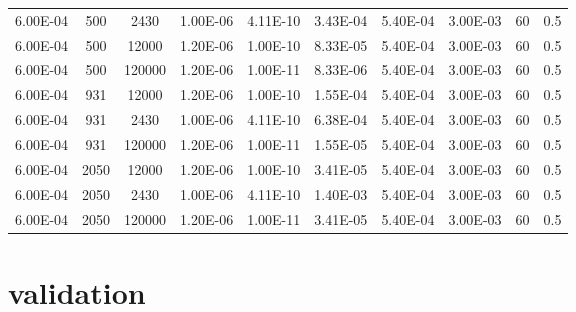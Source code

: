 \documentclass[../thesis.tex]{subfiles}
\begin{document}
\begin{landscape}
\begin{table}[htb]
\begin{tabular}{cccccccccc}
			6.00E-04            & 500         & 2430        & 1.00E-06               & 4.11E-10               & 3.43E-04              & 5.40E-04      & 3.00E-03        & 60                            & 0.5                       \\
			6.00E-04            & 500         & 12000       & 1.20E-06               & 1.00E-10               & 8.33E-05              & 5.40E-04      & 3.00E-03        & 60                            & 0.5                       \\
			6.00E-04            & 500         & 120000      & 1.20E-06               & 1.00E-11               & 8.33E-06              & 5.40E-04      & 3.00E-03        & 60                            & 0.5                       \\
			6.00E-04            & 931         & 12000       & 1.20E-06               & 1.00E-10               & 1.55E-04              & 5.40E-04      & 3.00E-03        & 60                            & 0.5                       \\
			6.00E-04            & 931         & 2430        & 1.00E-06               & 4.11E-10               & 6.38E-04              & 5.40E-04      & 3.00E-03        & 60                            & 0.5                       \\
			6.00E-04            & 931         & 120000      & 1.20E-06               & 1.00E-11               & 1.55E-05              & 5.40E-04      & 3.00E-03        & 60                            & 0.5                       \\
			6.00E-04            & 2050        & 12000       & 1.20E-06               & 1.00E-10               & 3.41E-05              & 5.40E-04      & 3.00E-03        & 60                            & 0.5                       \\
			6.00E-04            & 2050        & 2430        & 1.00E-06               & 4.11E-10               & 1.40E-03              & 5.40E-04      & 3.00E-03        & 60                            & 0.5                       \\
			6.00E-04            & 2050        & 120000      & 1.20E-06               & 1.00E-11               & 3.41E-05              & 5.40E-04      & 3.00E-03        & 60                            & 0.5						\\
			\hline      
		\end{tabular}
	\end{table}
\end{landscape}

\section{validation}
\label{chp:validation}
\end{document}
